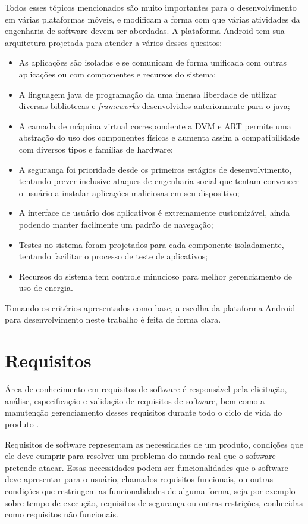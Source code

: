 Todos esses tópicos mencionados são muito importantes para o desenvolvimento em várias plataformas móveis, e modificam a forma com que várias atividades da engenharia de software devem ser abordadas. A plataforma Android tem sua arquitetura projetada para atender a vários desses quesitos:
\begin{itemize}
\item As aplicações são isoladas e se comunicam de forma unificada com outras aplicações ou com componentes e recursos do sistema;
\item A linguagem java de programação da uma imensa liberdade de utilizar diversas bibliotecas e \textit{frameworks} desenvolvidos anteriormente para o java;
\item A camada de máquina virtual correspondente a DVM e ART permite uma abstração do uso dos componentes físicos e aumenta assim a compatibilidade com diversos tipos e famílias de hardware;
\item A segurança foi prioridade desde os primeiros estágios de desenvolvimento, tentando prever inclusive ataques de engenharia social que tentam convencer o usuário a instalar aplicações maliciosas em seu dispositivo;
\item A interface de usuário dos aplicativos é extremamente customizável, ainda podendo manter facilmente um padrão de navegação;
\item Testes no sistema foram projetados para cada componente isoladamente, tentando facilitar o processo de teste de aplicativos;
\item Recursos do sistema tem controle minucioso para melhor gerenciamento de uso de energia.
\end{itemize}

Tomando os critérios apresentados como base, a escolha da plataforma Android para desenvolvimento neste trabalho é feita de forma clara.

\section{Requisitos}

Área de conhecimento em requisitos de software é responsável pela elicitação, análise, especificação e validação de requisitos de software, bem como a manutenção gerenciamento desses requisitos durante todo o ciclo de vida do produto \cite{swebok}.

Requisitos de software representam as necessidades de um produto, condições que ele deve cumprir para resolver um problema do mundo real que o software pretende atacar. Essas necessidades podem ser funcionalidades que o software deve apresentar para o usuário, chamados requisitos funcionais, ou outras condições que restringem as funcionalidades de alguma forma, seja por exemplo sobre tempo de execução, requisitos de segurança ou outras restrições, conhecidas como requisitos não funcionais.

